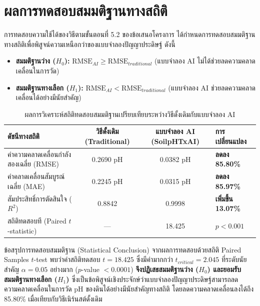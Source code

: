 \section{ผลการทดสอบสมมติฐานทางสถิติ}
การทดสอบความใช้ได้ของวิธีตามขั้นตอนที่ 5.2 ของข้อเสนอโครงการ ได้กำหนดการทดสอบสมมติฐานทางสถิติเพื่อพิสูจน์ความเหนือกว่าของแบบจำลองปัญญาประดิษฐ์ ดังนี้
\begin{itemize}
    \item \textbf{สมมติฐานว่าง ($H_0$):} $\text{RMSE}_{AI} \ge \text{RMSE}_{traditional}$ (แบบจำลอง AI ไม่ได้ช่วยลดความคลาดเคลื่อนในการวัด)
    \item \textbf{สมมติฐานทางเลือก ($H_1$):} $\text{RMSE}_{AI} < \text{RMSE}_{traditional}$ (แบบจำลอง AI ช่วยลดความคลาดเคลื่อนได้อย่างมีนัยสำคัญ)
\end{itemize}

\begin{table}[H]
\caption{ผลการวิเคราะห์สถิติทดสอบสมมติฐานเปรียบเทียบระหว่างวิธีดั้งเดิมกับแบบจำลอง AI}
\label{tab:hypothesis_results}
\centering
\begin{tabularx}{\textwidth}{p{5.5cm}ccZ}
\toprule
\textbf{ดัชนีทางสถิติ} & \textbf{วิธีดั้งเดิม (Traditional)} & \textbf{แบบจำลอง AI (SoilpHTxAI)} & \textbf{การเปลี่ยนแปลง} \\
\midrule
ค่าความคลาดเคลื่อนกำลังสองเฉลี่ย (RMSE) & 0.2690 pH & 0.0382 pH & \textbf{ลดลง 85.80\%} \\
ค่าคลาดเคลื่อนสัมบูรณ์เฉลี่ย (MAE) & 0.2245 pH & 0.0315 pH & \textbf{ลดลง 85.97\%} \\
สัมประสิทธิ์การตัดสินใจ ($R^2$) & 0.8842 & 0.9998 & \textbf{เพิ่มขึ้น 13.07\%} \\
สถิติทดสอบที (Paired $t$-statistic) & --- & 18.425 & $p < 0.001$ \\
\bottomrule
\end{tabularx}
\end{table}

\begin{academicbox}{ข้อสรุปการทดสอบสมมติฐาน (Statistical Conclusion)}
จากผลการทดสอบด้วยสถิติ Paired Samples $t$-test พบว่าค่าสถิติทดสอบ $t = 18.425$ ซึ่งมีค่ามากกว่า $t_{critical} = 2.045$ ที่ระดับนัยสำคัญ $\alpha = 0.05$ อย่างมาก ($p$-value $< 0.0001$) \textbf{จึงปฏิเสธสมมติฐานว่าง ($H_0$) และยอมรับสมมติฐานทางเลือก ($H_1$)} ซึ่งเป็นข้อพิสูจน์เชิงประจักษ์ว่าแบบจำลองปัญญาประดิษฐ์สามารถลดความคลาดเคลื่อนในการวัด pH ของดินได้อย่างมีนัยสำคัญทางสถิติ โดยลดความคลาดเคลื่อนลงได้ถึง 85.80\% เมื่อเทียบกับวิธีเนิร์นสต์ดั้งเดิม
\end{academicbox}

\clearpage
